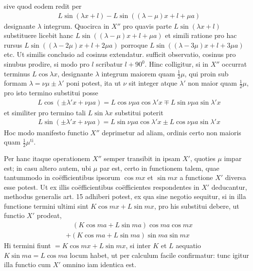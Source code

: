 sive quod eodem redit per
\[
\begin{aligned}
&L\sin(\lambda x+l)-L\sin((\lambda-\mu)x+l+\mu a)
\end{aligned}
\]
designante $\lambda$ integrum. Quocirca in $X''$ pro quavis parte $L\sin(\lambda x+l)$ substituere licebit hanc $L\sin((\lambda-\mu)x+l+\mu a)$ et simili ratione pro hac rursus
$L\sin((\lambda-2\mu)x+l+2\mu a)$ porroque $L\sin((\lambda-3\mu)x+l+3\mu a)$ etc. Ut similis
conclusio ad cosinus extendatur. sufficit observatio, cosinus pro sinubus prodire,
si modo pro $l$ scribatur $l+90^{0}$. Hinc colligitur, si in $X''$ occurrat terminus
$L\cos\lambda x$, designante $\lambda$ integrum maiorem quam $\frac12\mu$, qui proin sub formam
$\lambda=\nu\mu\pm\lambda'$ poni potest, ita ut $\nu$ sit integer atque $\lambda'$ non maior quam $\frac12\mu$, pro
isto termino substitui posse
\[
\begin{aligned}
&L\cos(\pm\lambda'x+\nu\mu a)=L\cos\nu\mu a\cos\lambda'x\mp L\sin\nu\mu a\sin\lambda'x
\end{aligned}
\]
et similiter pro termino tali $L\sin\lambda x$ substitui poterit
\[
\begin{aligned}
&L\sin(\pm\lambda'x+\nu\mu a)=L\sin\nu\mu a\cos\lambda'x\pm L\cos\nu\mu a\sin\lambda'x
\end{aligned}
\]
Hoc modo manifesto functio $X''$ deprimetur ad aliam, ordinis certo non maioris
quam $\frac12\mu^{\mathrm{ti}}$.

Per hanc itaque operationem $X''$ semper transibit in ipsam $X'$, quoties $\mu$
impar est; in casu altero autem, ubi $\mu$ par est, certo in functionem talem, quae
tantummodo in co\"efficientibus ipsorum $\cos mx$ et $\sin mx$ a functione $X'$ diversa
esse potest. Ut ex illis co\"efficientibus co\"efficientes respondentes in $X'$ deducantur, methodus generalis art. 15 adhiberi potest, ex qua sine negotio sequitur, si
in illa functione termini ultimi sint $K\cos mx+L\sin mx$, pro his substitui debere, ut functio $X'$ prodeat,
\[
\begin{aligned}
&\quad(K\cos ma+L\sin ma)\cos ma\cos mx\\[5pt]
&+(K\cos ma+L\sin ma)\sin ma\sin mx
\end{aligned}
\]
Hi termini fiunt $=K\cos mx+L\sin mx$, si inter $K$ et $L$ aequatio $K\sin ma=L\cos ma$
locum habet, ut per calculum facile confirmatur: tunc igitur illa functio cum $X'$
omnino iam identica est.
\endgroup
